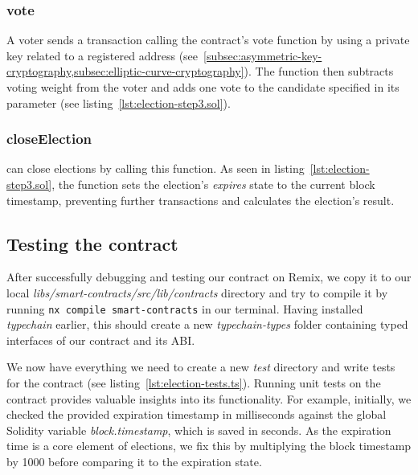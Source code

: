 \subsubsection{vote}

A voter sends a transaction calling the contract's vote function by using a private key related to a registered address (see~\cref{subsec:asymmetric-key-cryptography,subsec:elliptic-curve-cryptography}).
The function then subtracts voting weight from the voter and adds one vote to the candidate specified in its parameter (see listing~\ref{lst:election-step3.sol}).

\subsubsection{closeElection}

 can close elections by calling this function.
As seen in listing~\ref{lst:election-step3.sol}, the function sets the election's \emph{expires} state to the current block timestamp, preventing further transactions and calculates the election's result.

\subsection{Testing the contract}\label{subsec:testing-the-contract}

After successfully debugging and testing our contract on Remix, we copy it to our local \emph{libs/smart-contracts/src/lib/contracts} directory and try to compile it by running \texttt{nx compile smart-contracts} in our terminal.
Having installed \emph{typechain} earlier, this should create a new \emph{typechain-types} folder containing typed interfaces of our contract and its \gls{ABI}.

We now have everything we need to create a new \emph{test} directory and write tests for the contract (see listing~\ref{lst:election-tests.ts}).
Running unit tests on the contract provides valuable insights into its functionality.
For example, initially, we checked the provided expiration timestamp in milliseconds against the global Solidity variable \emph{block.timestamp}, which is saved in seconds.
As the expiration time is a core element of elections, we fix this by multiplying the block timestamp by 1000 before comparing it to the expiration state.


